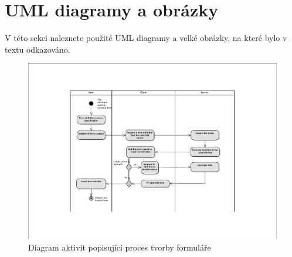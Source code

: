 \chapter{UML diagramy a obrázky}
V této sekci naleznete použité UML diagramy a velké obrázky, na které bylo v textu odkazováno.

\begin{figure}
\begin{center}
\includegraphics[width=\textheight, height=\textwidth, keepaspectratio, angle=270, trim=4 4 4 4, clip]{figures/createFormActivityDiagram}
\caption{Diagram aktivit popisující proces tvorby formuláře}
\label{img:createFormActivityDiagram}
\end{center}
\end{figure}

